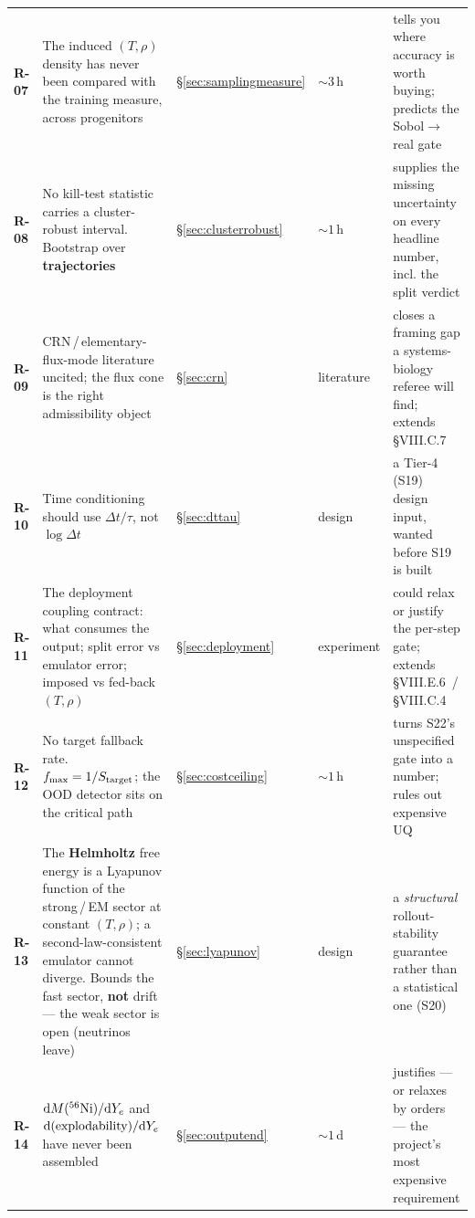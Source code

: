 \begin{longtable}{@{}L{1.15cm} L{5.85cm} L{1.9cm} L{1.6cm} L{4.0cm}@{}}
\textbf{R-07} &
The induced $(T, \rho)$ density has never been compared with the training
measure, across progenitors & \S\ref{sec:samplingmeasure} & ${\sim}3$\,h &
tells you where accuracy is worth buying; predicts the Sobol$\to$real gate \\

\textbf{R-08} &
No kill-test statistic carries a cluster-robust interval. Bootstrap over
\textbf{trajectories} & \S\ref{sec:clusterrobust} & ${\sim}1$\,h &
supplies the missing uncertainty on every headline number, incl. the split
verdict \\

\textbf{R-09} &
CRN\,/\,elementary-flux-mode literature uncited; the flux cone is the right
admissibility object & \S\ref{sec:crn} & literature &
closes a framing gap a systems-biology referee will find; extends
 \S VIII.C.7 \\

\textbf{R-10} &
Time conditioning should use $\Delta t/\tau$, not $\log\Delta t$ &
\S\ref{sec:dttau} & design &
a Tier-4 (S19) design input, wanted before S19 is built \\

\textbf{R-11} &
The deployment coupling contract: what consumes the output; split error vs
emulator error; imposed vs fed-back $(T, \rho)$ & \S\ref{sec:deployment} &
experiment &
could relax or justify the per-step gate; extends  \S VIII.E.6
\,/\,\S VIII.C.4 \\

\textbf{R-12} &
No target fallback rate. $f_{\max} = 1/S_{\rm target}$; the OOD detector sits on
the critical path & \S\ref{sec:costceiling} & ${\sim}1$\,h &
turns S22's unspecified gate into a number; rules out expensive UQ \\

\textbf{R-13} &
The \textbf{Helmholtz} free energy is a Lyapunov function of the strong\,/\,EM
sector at constant $(T, \rho)$; a second-law-consistent emulator cannot diverge.
Bounds the fast sector, \textbf{not} \Ye{} drift --- the weak sector is open
(neutrinos leave) & \S\ref{sec:lyapunov} & design &
a \emph{structural} rollout-stability guarantee rather than a statistical one
(S20) \\

\textbf{R-14} &
$\dd M(\nuc{Ni}{56})/\dd\Ye$ and $\dd(\text{explodability})/\dd\Ye$ have never
been assembled & \S\ref{sec:outputend} & ${\sim}1$\,d &
justifies --- or relaxes by orders --- the project's most expensive
requirement \\


\end{longtable}

